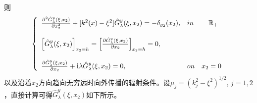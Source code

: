 则
\begin{eqnarray}
\left\{
\begin{array}{lll}
 \frac{\partial^2\hat{G}^y_{\lambda}(\xi,x_2)}{\partial x^2_2}+[k^2(x)-\xi^2]\hat{G}^y_{\lambda}(\xi,x_2)=-\delta_{y_2}(x_2),&in&\quad \mathbb{R}_+\\
 & &\\
 \left[\hat{G}^y_{\lambda}(\xi,x_2)\right]_{x_2=h}=\left[\frac{\partial\hat{G}^y_{\lambda}(\xi,x_2)}{\partial x_2}\right]_{x_2=h}=0,& &\\
 & &\\
 \frac{\partial \hat{G}^y_{\lambda}(\xi,x_2)}{\partial x_2}+\mathbf{i}\lambda\hat{G}^y_{\lambda}(\xi,x_2)=0,&on &x_2=0
\end{array}
\right.
\end{eqnarray}
以及沿着$x_2$方向趋向无穷远时向外传播的辐射条件。设$\mu_j=(k_j^2-\xi^2)^{1/2}$, $j=1,2$，直接计算可得$\hat{G}^y_{\lambda}(\xi,x_2)$如下所示。
